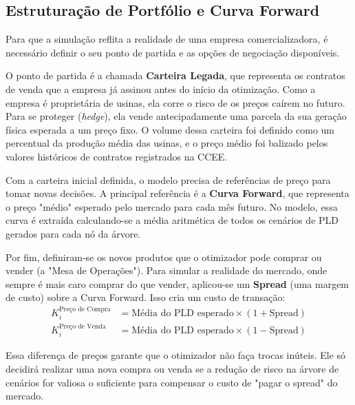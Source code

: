 \subsection{Estruturação de Portfólio e Curva Forward}

Para que a simulação reflita a realidade de uma empresa comercializadora, é necessário definir o seu ponto de partida e as opções de negociação disponíveis. 

O ponto de partida é a chamada \textbf{Carteira Legada}, que representa os contratos de venda que a empresa já assinou antes do início da otimização. Como a empresa é proprietária de usinas, ela corre o risco de os preços caírem no futuro. Para se proteger (\textit{hedge}), ela vende antecipadamente uma parcela da sua geração física esperada a um preço fixo. O volume dessa carteira foi definido como um percentual da produção média das usinas, e o preço médio foi balizado pelos valores históricos de contratos registrados na CCEE.

Com a carteira inicial definida, o modelo precisa de referências de preço para tomar novas decisões. A principal referência é a \textbf{Curva Forward}, que representa o preço "médio" esperado pelo mercado para cada mês futuro. No modelo, essa curva é extraída calculando-se a média aritmética de todos os cenários de PLD gerados para cada nó da árvore.

Por fim, definiram-se os novos produtos que o otimizador pode comprar ou vender (a "Mesa de Operações"). Para simular a realidade do mercado, onde sempre é mais caro comprar do que vender, aplicou-se um \textbf{Spread} (uma margem de custo) sobre a Curva Forward. Isso cria um custo de transação:
\begin{align}
    K_i^{\text{Preço de Compra}} &= \text{Média do PLD esperado} \times (1 + \text{Spread}) \\
    K_i^{\text{Preço de Venda}} &= \text{Média do PLD esperado} \times (1 - \text{Spread})
\end{align}

Essa diferença de preços garante que o otimizador não faça trocas inúteis. Ele só decidirá realizar uma nova compra ou venda se a redução de risco na árvore de cenários for valiosa o suficiente para compensar o custo de "pagar o spread" do mercado.